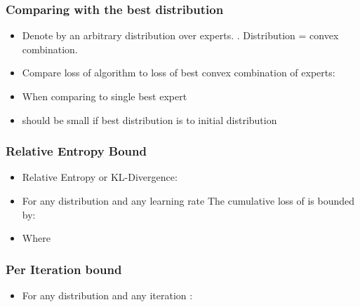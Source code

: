 \documentclass{beamer}
\begin{document}
\begin{frame}
  \frametitle{Comparing with the best distribution}
  \begin{itemize}
  \item Denote by \R{$\vecq$} an arbitrary distribution over 
    experts. . Distribution = convex combination.
  \item Compare loss of algorithm to loss of best
    convex combination of experts:
  \R{\[ \sum_{t=1}^T L_A^t \leq + a \min_{\vecq \in
        \Delta^N} \sum_{t=1}^T \vecq \cdot \costvec{t} + c X \]}
  \item When comparing to single best expert 
  \item {}  should be small if best distribution
    \R{$\vecq^*$} is  to initial distribution 
  \end{itemize}
\end{frame}

\begin{frame}
    \frametitle{Relative Entropy Bound}
    \begin{itemize}
  \item Relative Entropy or KL-Divergence:
  \item For any distribution \R{$\vecq$} and any learning rate  The
    cumulative loss of \B{$\ouralg$} is bounded by:
    \R{\[
      \sum_{t=1}^T \vecp_t \cdot \costvec{t} \leq a_{\eta}\;
      \sum_{t=1}^T \vecq \cdot \costvec{t} +c_{\eta}\;\RE{\vecq}{\vecp_0}
    \]}
  \item Where 
  \end{itemize}
\end{frame}

\begin{frame}
\frametitle{Per Iteration bound}
\begin{itemize}
    \item For any distribution \R{$\vecq$} and any iteration 
    \B{$\ouralg$}:
\end{itemize}
\end{frame}
\end{document}
